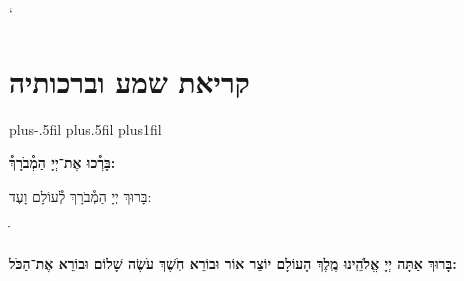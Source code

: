 \documentclass[twoside, openany, parskip=half, 11pt]{book}
\begin{document}
\enlargethispage{\baselineskip}

`\vspace{1.25\baselineskip}
\chapter[שחרית לחול]{קריאת שמע וברכותיה}
\newcommand{\barachu}{
\begin{minipage}{0.6\textwidth}
\leftskip=0pt plus-.5fil
\rightskip=0pt plus.5fil
\parfillskip=0pt plus1fil
\begin{large}

\shatz
\begin{Large}\textbf{בָּרְ֯כוּ אֶת־יְיָ הַמְ֯בֹרָךְ֯:}\end{Large}
\end{large}

\vspace{12pt}

\shatzvkahal
בָּרוּךְ יְיָ הַמְ֯בֹרָךְ לְ֯עוֹלָם וָעֶד:
\end{minipage}
ֺֺ%

%
}


\barachu

\textbf{
בָּרוּךְ אַתָּה יְיָ אֱלֹהֵֽינוּ מֶֽלֶךְ הָעוֹלָם יוֹצֵר אוֹר וּבוֹרֵא חֹֽשֶׁךְ עֹשֶׂה שָׁלוֹם וּבוֹרֵא אֶת־הַכֹּל:
}

\newcommand{\hameir}{
\firstword{הַמֵּאִיר}
לָאָֽרֶץ וְ֯לַדָּרִים עָלֶֽיהָ בְּ֯רַחֲמִים וּבְטוּבוֹ מְ֯חַדֵּשׁ בְּ֯כׇל־יוֹם תָּמִיד מַעֲשֵׂה בְ֯רֵאשִׁית: \source{תהלים קד}מָה־רַבּ֬וּ מַעֲשֶׂ֨יךָ ׀ יְיָ֗ כֻּ֭לָּם בְּ֯חׇכְמָ֣ה עָשִׂ֑יתָ מָלְ֯אָ֥ה הָ֝אָ֗רֶץ קִנְיָנֶֽךָ׃ הַמֶּֽלֶךְ הַמְ֯רוֹמָם לְ֯בַדּוֹ מֵאָז הַמְ֯שֻׁבָּח וְ֯הַמְ֯פֹאָר וְ֯הַמִּתְנַשֵּׂא מִימוֹת עוֹלָם: אֱלֹהֵי עוֹלָם בְּ֯רַחֲמֶיךָ הָרַבִּים רַחֵם עָלֵינוּ אֲדוֹן עֻזֵּֽנוּ צוּר מִשְׂגַּבֵּנוּ מָגֵן יִשְׁעֵֽנוּ מִשְׂגָּב בַּעֲדֵֽנוּ: אֵ֗ל בָּ֗רוּךְ גְּ֯֗דוֹל דֵּ֗עָה הֵ֗כִין וּ֗פָעַל זׇׇׇׇׇׇ֗הֳרֵי חַ֗מָּה ט֗וֹב יָ֗צַר כָּ֗בוֹד לִ֗שְׁמוֹ מְ֯֗אוֹרוֹת נָ֗תַן סְ֯֗בִיבוֹת עֻ֗זּוֹ פִּ֗נּוֹת צְ֯֗בָאָיו קְ֯֗דוֹשִׁים ר֗וֹמֲמֵי שַׁ֗דַּי תָּ֗מִיד מְ֯סַפְּ֯רִים כְּ֯בוֹד־אֵל וּקְדֻשָׁתוֹ: תִּתְבָּרַךְ יְיָ אֱלֹהֵֽינוּ עַל־שֶׁבַח מַעֲשֵׂי יָדֶֽיךָ וְ֯עַל־מְ֯אֽוֹרֵי אוֹר שֶׁעָשִֽׂיתָ יְ֯פָאֲרֽוּךָ סֶּֽלָה:
}
\end{document}
